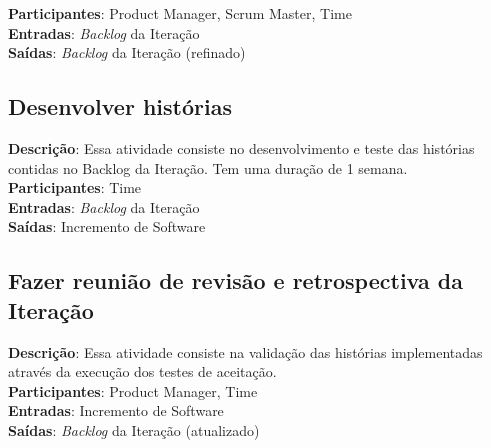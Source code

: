   \textbf{Participantes}: Product Manager, Scrum Master, Time\\
  
  \textbf{Entradas}: \textit{Backlog} da Iteração \\
  
  \textbf{Saídas}:   \textit{Backlog} da Iteração (refinado)\\

\subsection{Desenvolver histórias}
  \textbf{Descrição}: Essa atividade consiste no desenvolvimento e teste das histórias contidas no Backlog da Iteração. Tem uma duração de 1 semana. \\
  
  \textbf{Participantes}: Time\\
  
  \textbf{Entradas}: \textit{Backlog} da Iteração \\
  
  \textbf{Saídas}:   Incremento de Software\\
  
\subsection{Fazer reunião de revisão e retrospectiva da Iteração}
  \textbf{Descrição}: Essa atividade consiste na validação das histórias implementadas através da execução dos testes de aceitação. \\
  
  \textbf{Participantes}: Product Manager, Time\\
  
  \textbf{Entradas}: Incremento de Software \\
  
  \textbf{Saídas}:   \textit{Backlog} da Iteração (atualizado)\\
